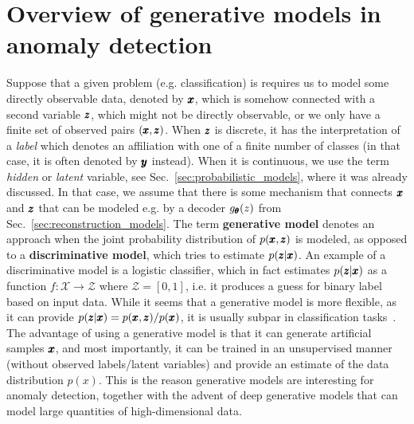 \chapter{Overview of generative models in anomaly detection} \label{sec:chapter_survey}
Suppose that a given problem (e.g. classification) is requires us to model some directly observable data, denoted by $\pmb{{x}}$, which is somehow connected with a second variable $\pmb{{z}}$, which might not be directly observable, or we only have a finite set of observed pairs $(\pmb{{x}},\pmb{{z}})$. When $\pmb{{z}}$ is discrete, it has the interpretation of a \textit{label} which denotes an affiliation with one of a finite number of classes (in that case, it is often denoted by $\pmb{{y}}$ instead). When it is continuous, we use the term \textit{hidden} or \textit{latent} variable, see Sec.~\ref{sec:probabilistic_models}, where it was already discussed. In that case, we assume that there is some mechanism that connects $\pmb{{x}}$ and $\pmb{{z}}$ that can be modeled e.g. by a decoder $g_{\pmb{{\theta}}}(z)$ from Sec.~\ref{sec:reconstruction_models}. The term \textbf{generative model} denotes an approach when the joint probability distribution of $p(\pmb{{x}},\pmb{{z}})$ is modeled, as opposed to a \textbf{discriminative model}, which tries to estimate $p(\pmb{{z}} \vert \pmb{{x}})$. An example of a discriminative model is a logistic classifier, which in fact estimates $p(\pmb{{z}} \vert \pmb{{x}})$ as a function $f:\mathcal{X} \rightarrow \mathcal{Z}$ where $\mathcal{Z} = [0,1]$, i.e. it produces a guess for binary label based on input data. While it seems that a generative model is more flexible, as it can provide  $p(\pmb{{z}} \vert \pmb{{x}}) = p(\pmb{{x}},\pmb{{z}})/p(\pmb{{x}})$, it is usually subpar in classification tasks~\cite{ng2001discriminative,bishop2007generative}. The advantage of using a generative model is that it can generate artificial samples $\pmb{{x}}$, and most importantly, it can be trained in an unsupervised manner (without observed labels/latent variables) and provide an estimate of the data distribution $p(x)$. This is the reason generative models are interesting for anomaly detection, together with the advent of deep generative models that can model large quantities of high-dimensional data.

